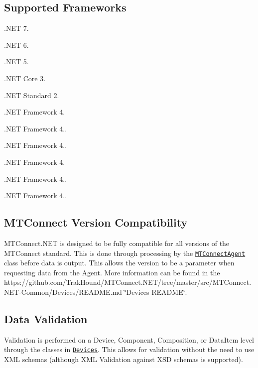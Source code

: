 \subsection*{Supported Frameworks}


\begin{DoxyItemize}
\item .N\+ET 7.
\item .N\+ET 6.
\item .N\+ET 5.
\item .N\+ET Core 3.
\item .N\+ET Standard 2.
\item .N\+ET Framework 4.
\item .N\+ET Framework 4..
\item .N\+ET Framework 4..
\item .N\+ET Framework 4.
\item .N\+ET Framework 4..
\item .N\+ET Framework 4..
\end{DoxyItemize}

\subsection*{M\+T\+Connect Version Compatibility}

M\+T\+Connect.\+N\+ET is designed to be fully compatible for all versions of the M\+T\+Connect standard. This is done through processing by the \href{https://github.com/TrakHound/MTConnect.NET/tree/master/src/MTConnect.NET-Common/Agents/MTConnectAgent.cs}{\tt M\+T\+Connect\+Agent} class before data is output. This allows the version to be a parameter when requesting data from the Agent. More information can be found in the https\+://github.com/\+Trak\+Hound/\+M\+T\+Connect.\+N\+ET/tree/master/src/\+M\+T\+Connect.N\+E\+T-\/\+Common/\+Devices/\+R\+E\+A\+D\+M\+E.\+md \char`\"{}\+Devices R\+E\+A\+D\+M\+E\char`\"{}.

\subsection*{Data Validation}

Validation is performed on a Device, Component, Composition, or Data\+Item level through the classes in \href{https://github.com/TrakHound/MTConnect.NET/tree/master/src/MTConnect.NET-Common/Devices}{\tt Devices}. This allows for validation without the need to use X\+ML schemas (although X\+ML Validation against X\+SD schemas is supported).

